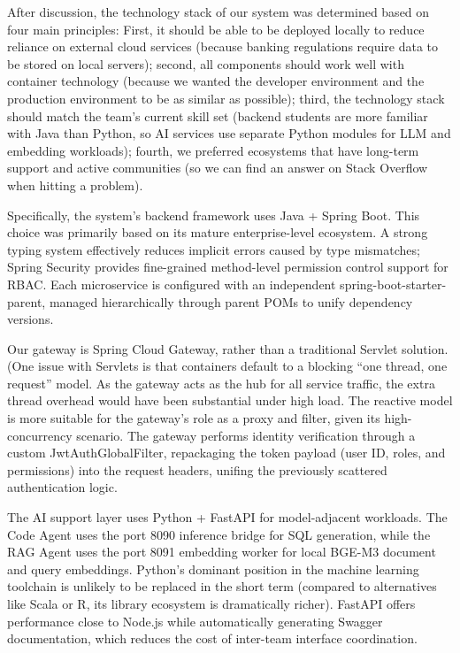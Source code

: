 After discussion, the technology stack of our system was determined based on four main principles: First, it should be able to be deployed locally to reduce reliance on external cloud services (because banking regulations require data to be stored on local servers); second, all components should work well with container technology (because we wanted the developer environment and the production environment to be as similar as possible); third, the technology stack should match the team's current skill set (backend students are more familiar with Java than Python, so AI services use separate Python modules for LLM and embedding workloads); fourth, we preferred ecosystems that have long-term support and active communities (so we can find an answer on Stack Overflow when hitting a problem).

Specifically, the system's backend framework uses Java + Spring Boot. This choice was primarily based on its mature enterprise-level ecosystem. A strong typing system effectively reduces implicit errors caused by type mismatches; Spring Security provides fine-grained method-level permission control support for RBAC. Each microservice is configured with an independent spring-boot-starter-parent, managed hierarchically through parent POMs to unify dependency versions.

Our gateway is Spring Cloud Gateway, rather than a traditional Servlet solution. (One issue with Servlets is that containers default to a blocking ``one thread, one request'' model. As the gateway acts as the hub for all service traffic, the extra thread overhead would have been substantial under high load. The reactive model is more suitable for the gateway's role as a proxy and filter, given its high-concurrency scenario. The gateway performs identity verification through a custom JwtAuthGlobalFilter, repackaging the token payload (user ID, roles, and permissions) into the request headers, unifing the previously scattered authentication logic.

The AI support layer uses Python + FastAPI for model-adjacent workloads. The Code Agent uses the port 8090 inference bridge for SQL generation, while the RAG Agent uses the port 8091 embedding worker for local BGE-M3 document and query embeddings. Python's dominant position in the machine learning toolchain is unlikely to be replaced in the short term (compared to alternatives like Scala or R, its library ecosystem is dramatically richer). FastAPI offers performance close to Node.js while automatically generating Swagger documentation, which reduces the cost of inter-team interface coordination.

